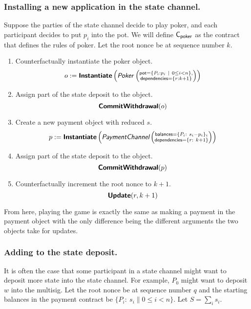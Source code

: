 \documentclass[prb,floatfix,reprint,nofootinbib,amsmath,amssymb,epsfig,pre,floats,letterpaper,groupedaffiliation,tightenlines,allcolors=blue,11pt]{revtex4}
\theoremstyle{definition}
\theoremstyle{definition}
\theoremstyle{definition}
\begin{document}
\subsubsection{Installing a new application in the state channel.}
Suppose the parties of the state channel decide to play poker, and each participant decides to put $p_i$ into the pot. We will define $\textsf{C}_{\textsf{poker}}$ as the contract that defines the rules of poker. Let the root nonce be at sequence number $k$.

\begin{enumerate}

\item Counterfactually instantiate the poker object.
\[
    o := \textsf{\textbf{Instantiate}}\left(\textsf{\textit{Poker}}\left(\substack{
    \textsf{pot}=\{P_i:p_i \ |\  0 \le i < n \}, \\
    \textsf{dependencies}=\left\{r:k+1\right\}
    }\right)
    \right)
\]

\item Assign part of the state deposit to the object.
\[
    \textsf{\textbf{CommitWithdrawal}}(o)
\]

\item Create a new payment object with reduced $s$.
\[
    p := \textsf{\textbf{Instantiate}}\left(\textit{\textsf{PaymentChannel}}\left(\substack{
    \textsf{balances}=\{P_i:\ s_i-p_i\}_i \\
    \textsf{dependencies}=\left\{r:\ k+1\right\}
    }\right)
    \right)
\]

\item Assign part of the state deposit to the object.
\[
    \textsf{\textbf{CommitWithdrawal}}(p)
\]

\item Counterfactually increment the root nonce to $k + 1$.
\[
\textsf{\textbf{Update}}(r, k+1)
\]
\end{enumerate}

From here, playing the game is exactly the same as making a payment in the payment object with the only difference being the different arguments the two objects take for updates.

\subsubsection{Adding to the state deposit.}
It is often the case that some participant in a state channel might want to deposit more state into the state channel. For example, $P_0$ might want to deposit $w$ into the multisig. Let the root nonce be at sequence number $q$ and the starting balances in the payment contract be $\{P_i:\ s_i \| 0 \le i < n \}$. Let $S = \sum_i s_i$.
\end{document}
